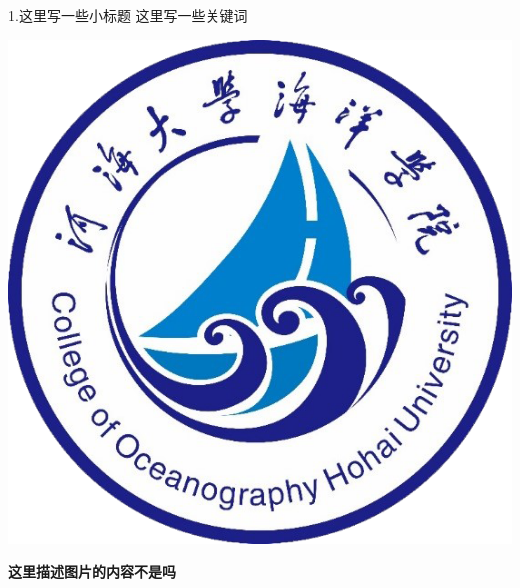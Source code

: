 \documentclass[10pt]{beamer}
\begin{document}
\begin{frame}{{1.这里写一些小标题 } \hfill 这里写一些关键词}
\begin{minipage}[t]{0.48\linewidth}
    \end{minipage}
    \hfill
    \begin{minipage}[t]{0.48\linewidth}
        \centering
        \includegraphics[width=1\linewidth]{fig/college_no_white.png} %
        \vspace{0.2cm}
            
        \scriptsize
        \textbf{这里描述图片的内容不是吗}
        
    \end{minipage}
\end{frame}
\end{document}
